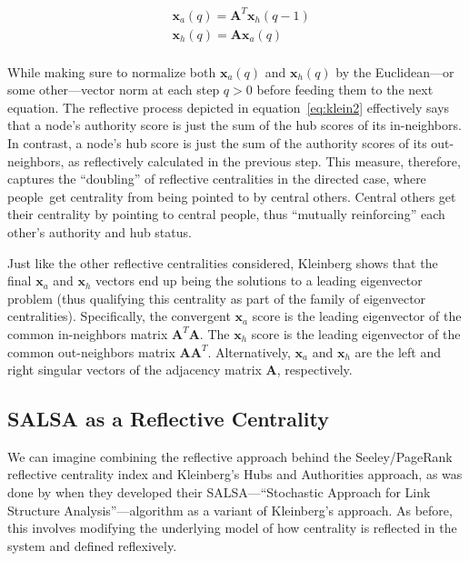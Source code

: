 \documentclass[a4paper,fleqn]{cas-sc}
\begin{document}
\begin{equation}
    \begin{split}
        &\mathbf{x}_a(q) = \mathbf{A}^T\mathbf{x}_h(q-1) \\
        &\mathbf{x}_h(q) = \mathbf{A}\mathbf{x}_a(q) \\
    \end{split}
    \label{eq:klein2}
\end{equation}

While making sure to normalize both $\mathbf{x}_a(q)$ and $\mathbf{x}_h(q)$ by the Euclidean---or some other---vector norm at each step $q > 0$ before feeding them to the next equation. The reflective process depicted in equation~\ref{eq:klein2} effectively says that a node's authority score is just the sum of the hub scores of its in-neighbors. In contrast, a node's hub score is just the sum of the authority scores of its out-neighbors, as reflectively calculated in the previous step. This measure, therefore, captures the ``doubling'' of reflective centralities in the directed case, where people\ get centrality from being pointed to by central others. Central others get their centrality by pointing to central people, thus ``mutually reinforcing'' \citep[136]{lempel_moran01} each other's authority and hub status. 

Just like the other reflective centralities considered, Kleinberg shows that the final $\mathbf{x}_a$ and $\mathbf{x}_h$ vectors end up being the solutions to a leading eigenvector problem (thus qualifying this centrality as part of the family of eigenvector centralities). Specifically, the convergent $\mathbf{x}_a$ score is the leading eigenvector of the common in-neighbors matrix $\mathbf{A}^T\mathbf{A}$. The $\mathbf{x}_h$ score is the leading eigenvector of the common out-neighbors matrix $\mathbf{A}\mathbf{A}^T$. Alternatively, $\mathbf{x}_a$ and $\mathbf{x}_h$ are the left and right singular vectors of the adjacency matrix $\mathbf{A}$, respectively.

\subsection{SALSA as a Reflective Centrality}
We can imagine combining the reflective approach behind the Seeley/PageRank reflective centrality index and Kleinberg's Hubs and Authorities approach, as was done by \citet{lempel_moran01} when they developed their SALSA---``Stochastic Approach for Link Structure Analysis''---algorithm as a variant of Kleinberg's approach. As before, this involves modifying the underlying model of how centrality is reflected in the system and defined reflexively. 
\end{document}
